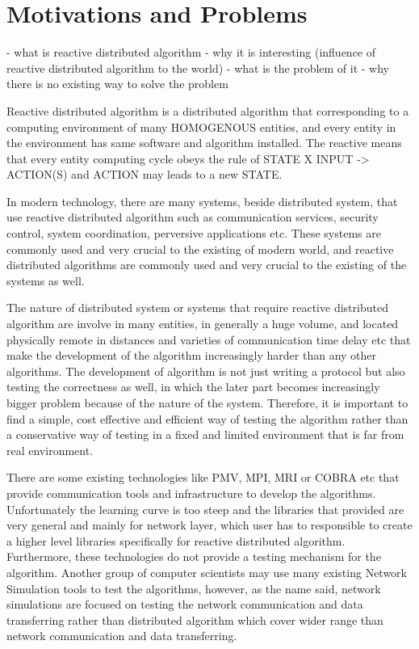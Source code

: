 
\section{Motivations and Problems}
- what is reactive distributed algorithm
- why it is interesting (influence of reactive distributed algorithm to the world)
- what is the problem of it
- why there is no existing way to solve the problem

Reactive distributed algorithm is a distributed algorithm that corresponding to a computing environment of many HOMOGENOUS entities, and every entity in the environment has same software and algorithm installed. The reactive means that every entity computing cycle obeys the rule of STATE X INPUT -> ACTION(S) and ACTION may leads to a new STATE.

In modern technology, there are many systems, beside distributed system, that use reactive distributed algorithm such as communication services, security control, system coordination, perversive applications etc. These systems are commonly used and very crucial to the existing of modern world, and reactive distributed algorithms are commonly used and very crucial to the existing of the systems as well.

The nature of distributed system or systems that require reactive distributed algorithm are involve in many entities, in generally a huge volume, and located physically remote in distances and varieties of communication time delay etc that make the development of the algorithm increasingly harder than any other algorithms. The development of algorithm is not just writing a protocol but also testing the correctness as well, in which the later part becomes increasingly bigger problem because of the nature of the system. Therefore, it is important to find a simple, cost effective and efficient way of testing the algorithm rather than a conservative way of testing in a fixed and limited environment that is far from real environment.

There are some existing technologies like PMV, MPI, MRI or COBRA etc that provide communication tools and infrastructure to develop the algorithms. Unfortunately the learning curve is too steep and the libraries that provided are very general and mainly for network layer, which user has to responsible to create a higher level libraries specifically for reactive distributed algorithm. Furthermore, these technologies do not provide a testing mechanism for the algorithm. Another group of computer scientists may use many existing Network Simulation tools to test the algorithms, however, as the name said, network simulations are focused on testing the network communication and data transferring rather than distributed algorithm which cover wider range than network communication and data transferring.

